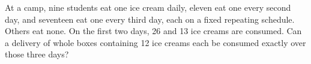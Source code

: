 At a camp, nine students eat one ice cream daily, eleven eat one every second day, and seventeen eat one every third day, each on a fixed repeating schedule. Others eat none. On the first two days, 26 and 13 ice creams are consumed. Can a delivery of whole boxes containing 12 ice creams each be consumed exactly over those three days?
